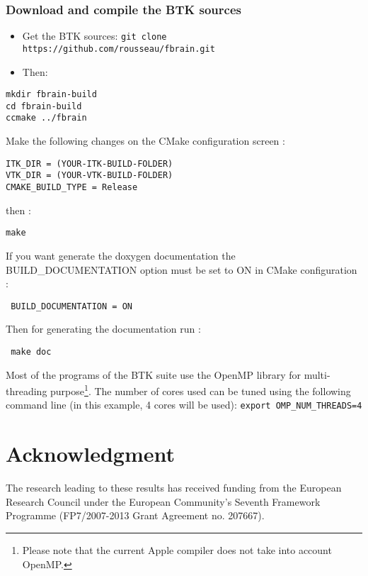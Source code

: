 \documentclass[a4paper,10pt]{article}
\begin{document}
\subsubsection{Download and compile the BTK sources}
\begin{itemize}
 \item Get the BTK sources: \texttt{git clone https://github.com/rousseau/fbrain.git }
 \item Then:
\end{itemize}
\begin{verbatim}
mkdir fbrain-build
cd fbrain-build
ccmake ../fbrain
\end{verbatim}
Make the following changes on the CMake configuration screen :
\begin{verbatim}
ITK_DIR = (YOUR-ITK-BUILD-FOLDER)
VTK_DIR = (YOUR-VTK-BUILD-FOLDER)
CMAKE_BUILD_TYPE = Release
\end{verbatim}
then :
\begin{verbatim}
make
\end{verbatim}
If you want generate the doxygen documentation the BUILD\_DOCUMENTATION option must be set to ON in CMake configuration :
\begin{verbatim}
 BUILD_DOCUMENTATION = ON
\end{verbatim}
Then for generating the documentation run :
\begin{verbatim}
 make doc
\end{verbatim}



Most of the programs of the BTK suite use the OpenMP library for multi-threading
purpose\footnote{Please note that the current Apple compiler does not take into account OpenMP.}. The number of cores used can be tuned using the following command line
(in this example, 4 cores will be used): \texttt{export OMP\_NUM\_THREADS=4}





\section*{Acknowledgment}
\small{The research leading to these results has received funding from the
European Research Council under the European Community’s Seventh Framework
Programme (FP7/2007-2013 Grant Agreement no. 207667).}



\end{document}
